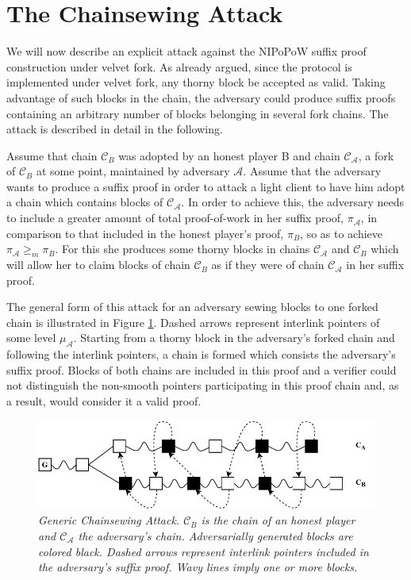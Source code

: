 \section{The Chainsewing Attack}
We  will now describe an explicit attack against the NIPoPoW suffix proof construction under velvet fork. As already argued, since the protocol is implemented under velvet fork, any thorny block be accepted as valid. Taking advantage of such blocks in the chain, the adversary could produce suffix proofs containing an arbitrary number of blocks belonging in several fork chains. The attack is described in detail in the following.

Assume that chain $\mathcal{C}_B$ was adopted by an honest player B and chain $\mathcal{C}_\mathcal{A}$, a fork of $\mathcal{C}_B$ at some point, maintained by adversary $\mathcal{A}$. Assume that the adversary wants to produce a suffix  proof in order to attack a light client to have him adopt a chain which contains blocks of $\mathcal{C}_\mathcal{A}$. In order to achieve this, the adversary needs to include a greater amount of total proof-of-work in her suffix proof, $\pi_\mathcal{A}$, in comparison to that included in the honest player's proof, $\pi_B$, so as to achieve $\pi_\mathcal{A} \geq_m \pi_B$. For this she produces some thorny blocks in chains $\mathcal{C}_\mathcal{A}$ and $\mathcal{C}_B$ which will allow her to claim blocks of chain $\mathcal{C}_B$ as if they were of chain $\mathcal{C}_\mathcal{A}$ in her suffix proof.

The general form of this attack for an adversary sewing blocks to one forked chain is illustrated in Figure \ref{fig:generic_attack}. Dashed arrows represent interlink pointers of some level $\mu_\mathcal{A}$. Starting from a thorny block in the adversary's forked chain and following the interlink pointers, a chain is formed which consists the adversary's suffix proof. Blocks of both chains are included in this proof and a verifier could not distinguish the non-smooth pointers participating in this proof chain and, as a result, would consider it a valid proof.

\begin{figure}[h]
	\begin{center}
		\includegraphics[scale=0.63
		]{figures/generic_chainsewing_attack.pdf}
	\end{center}
	\caption{\textit{Generic Chainsewing Attack. $\mathcal{C}_B$ is the chain of an honest 	player and $\mathcal{C}_\mathcal{A}$ the adversary's chain. Adversarially generated blocks are 	colored black. Dashed arrows represent interlink pointers included in the 	adversary's suffix proof. Wavy lines imply one or more blocks.}}
	\label{fig:generic_attack}
\end{figure}

